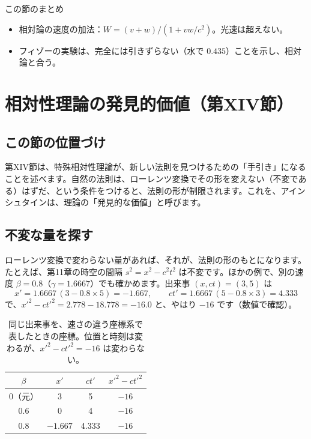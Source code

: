 \documentclass[a4paper,11pt,openany]{ltjsbook}
\begin{document}
\begin{pointbox}{この節のまとめ}
\begin{itemize}[leftmargin=*]
\item 相対論の速度の加法：$W=(v+w)/(1+vw/c^2)$。光速は超えない。
\item フィゾーの実験は、完全には引きずらない（水で $0.435$）ことを示し、相対論と合う。
\end{itemize}
\end{pointbox}

\chapter{相対性理論の発見的価値（第XIV節）}

\section{この節の位置づけ}

第XIV節は、特殊相対性理論が、新しい法則を見つけるための「手引き」になることを述べます。自然の法則は、ローレンツ変換でその形を変えない（不変である）はずだ、という条件をつけると、法則の形が制限されます。これを、アインシュタインは、理論の「発見的な価値」と呼びます。

\section{不変な量を探す}

ローレンツ変換で変わらない量があれば、それが、法則の形のもとになります。たとえば、第11章の時空の間隔 $s^2=x^2-c^2t^2$ は不変です。ほかの例で、別の速度 $\beta=0.8$（$\gamma=1.6667$）でも確かめます。出来事 $(x,ct)=(3,5)$ は
\[
x'=1.6667\,(3-0.8\times5)=-1.667,\qquad ct'=1.6667\,(5-0.8\times3)=4.333
\]
で、$x'^2-ct'^2=2.778-18.778=-16.0$ と、やはり $-16$ です（数値で確認）。

\begin{table}[htbp]
\centering
\begin{tabular}{c|ccc}
\toprule
$\beta$ & $x'$ & $ct'$ & $x'^2-ct'^2$\\
\midrule
0（元） & 3 & 5 & $-16$\\
0.6 & 0 & 4 & $-16$\\
0.8 & $-1.667$ & 4.333 & $-16$\\
\bottomrule
\end{tabular}
\caption{同じ出来事を、速さの違う座標系で表したときの座標。位置と時刻は変わるが、$x'^2-ct'^2=-16$ は変わらない。}
\end{table}
\end{document}
